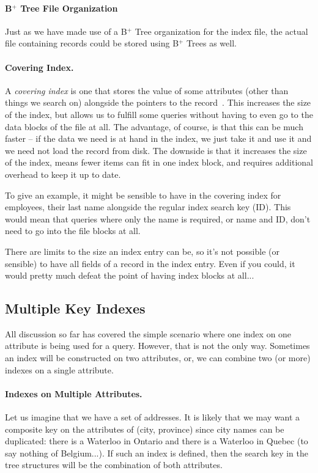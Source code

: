 \paragraph{B$^{+}$ Tree File Organization} 
Just as we have made use of a B$^{+}$ Tree organization for the index file, the actual file containing records could be stored using B$^{+}$ Trees as well.

\paragraph{Covering Index.} 
A \textit{covering index} is one that stores the value of some attributes (other than things we search on) alongside the pointers to the record~\cite{dsc}. This increases the size of the index, but allows us to fulfill some queries without having to even go to the data blocks of the file at all. The advantage, of course, is that this can be much faster -- if the data we need is at hand in the index, we just take it and use it and we need not load the record from disk. The downside is that it increases the size of the index, means fewer items can fit in one index block, and requires additional overhead to keep it up to date.

To give an example, it might be sensible to have in the covering index for employees, their last name alongside the regular index search key (ID). This would mean that queries where only the name is required, or name and ID, don't need to go into the file blocks at all.

There are limits to the size an index entry can be, so it's not possible (or sensible) to have all fields of a record in the index entry. Even if you could, it would pretty much defeat the point of having index blocks at all...

\subsection*{Multiple Key Indexes}

All discussion so far has covered the simple scenario where one index on one attribute is being used for a query. However, that is not the only way. Sometimes an index will be constructed on two attributes, or, we can combine two (or more) indexes on a single attribute. 

\paragraph{Indexes on Multiple Attributes.} Let us imagine that we have a set of addresses. It is likely that we may want a composite key on the attributes of (city, province) since city names can be duplicated: there is a Waterloo in Ontario and there is a Waterloo in Quebec (to say nothing of Belgium...). If such an index is defined, then the search key in the tree structures will be the combination of both attributes. 

